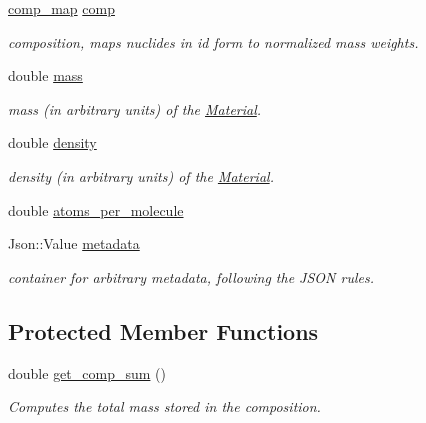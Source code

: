 \begin{DoxyCompactItemize}
\item 
\mbox{\label{classpyne_1_1_material_a2b0e850a66f2b8cb2b106307a00a18ed}} 
\hyperlink{namespacepyne_a86738cecccf4ce3f4ecc2ff6f45ce1a2}{comp\+\_\+map} \hyperlink{classpyne_1_1_material_a2b0e850a66f2b8cb2b106307a00a18ed}{comp}
\begin{DoxyCompactList}\small\item\em composition, maps nuclides in id form to normalized mass weights. \end{DoxyCompactList}\item 
\mbox{\label{classpyne_1_1_material_a729ebba0be2879f26f1fcf3b100d3b5d}} 
double \hyperlink{classpyne_1_1_material_a729ebba0be2879f26f1fcf3b100d3b5d}{mass}
\begin{DoxyCompactList}\small\item\em mass (in arbitrary units) of the \hyperlink{classpyne_1_1_material}{Material}. \end{DoxyCompactList}\item 
\mbox{\label{classpyne_1_1_material_a916eb7ed0143844a505c454d47755ab0}} 
double \hyperlink{classpyne_1_1_material_a916eb7ed0143844a505c454d47755ab0}{density}
\begin{DoxyCompactList}\small\item\em density (in arbitrary units) of the \hyperlink{classpyne_1_1_material}{Material}. \end{DoxyCompactList}\item 
double \hyperlink{classpyne_1_1_material_a7ddff1aaebc94bcda22d3422c093a756}{atoms\+\_\+per\+\_\+molecule}
\item 
\mbox{\label{classpyne_1_1_material_aee299ae39a32a7ff98e14c2aa3eabe32}} 
Json\+::\+Value \hyperlink{classpyne_1_1_material_aee299ae39a32a7ff98e14c2aa3eabe32}{metadata}
\begin{DoxyCompactList}\small\item\em container for arbitrary metadata, following the J\+S\+ON rules. \end{DoxyCompactList}\end{DoxyCompactItemize}
\subsection*{Protected Member Functions}
\begin{DoxyCompactItemize}
\item 
\mbox{\label{classpyne_1_1_material_a6bfe2556962da33cc05eb1e88bdebf42}} 
double \hyperlink{classpyne_1_1_material_a6bfe2556962da33cc05eb1e88bdebf42}{get\+\_\+comp\+\_\+sum} ()
\begin{DoxyCompactList}\small\item\em Computes the total mass stored in the composition. \end{DoxyCompactList}\end{DoxyCompactItemize}


